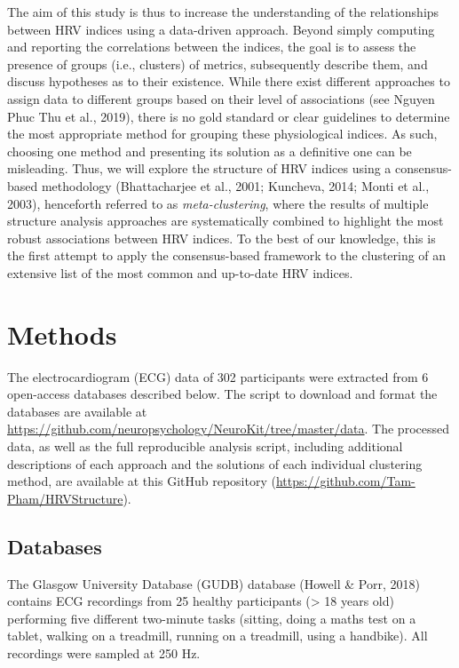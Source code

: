 \documentclass[
  english,
  jou,floatsintext]{apa6}
\begin{document}
The aim of this study is thus to increase the understanding of the relationships between HRV indices using a data-driven approach. Beyond simply computing and reporting the correlations between the indices, the goal is to assess the presence of groups (i.e., clusters) of metrics, subsequently describe them, and discuss hypotheses as to their existence. While there exist different approaches to assign data to different groups based on their level of associations (see Nguyen Phuc Thu et al., 2019), there is no gold standard or clear guidelines to determine the most appropriate method for grouping these physiological indices. As such, choosing one method and presenting its solution as a definitive one can be misleading. Thus, we will explore the structure of HRV indices using a consensus-based methodology (Bhattacharjee et al., 2001; Kuncheva, 2014; Monti et al., 2003), henceforth referred to as \emph{meta-clustering}, where the results of multiple structure analysis approaches are systematically combined to highlight the most robust associations between HRV indices. To the best of our knowledge, this is the first attempt to apply the consensus-based framework to the clustering of an extensive list of the most common and up-to-date HRV indices.

\hypertarget{methods}{%
\section{Methods}\label{methods}}

The electrocardiogram (ECG) data of 302 participants were extracted from 6 open-access databases described below. The script to download and format the databases are available at \url{https://github.com/neuropsychology/NeuroKit/tree/master/data}. The processed data, as well as the full reproducible analysis script, including additional descriptions of each approach and the solutions of each individual clustering method, are available at this GitHub repository (\url{https://github.com/Tam-Pham/HRVStructure}).

\hypertarget{databases}{%
\subsection{Databases}\label{databases}}

The Glasgow University Database (GUDB) database (Howell \& Porr, 2018) contains ECG recordings from 25 healthy participants (\textgreater{} 18 years old) performing five different two-minute tasks (sitting, doing a maths test on a tablet, walking on a treadmill, running on a treadmill, using a handbike). All recordings were sampled at 250 Hz.
\end{document}
